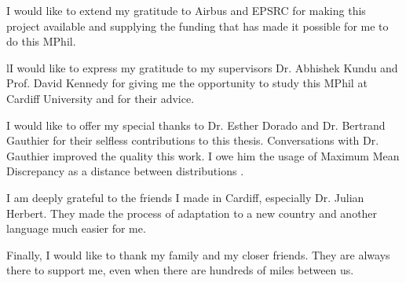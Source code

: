\documentclass[
12pt, %
english, %
nohyperref, %
headsepline, %
]{MastersDoctoralThesis} %
\theoremstyle{remark}
\begin{document}

\begin{acknowledgements}
\addchaptertocentry{\acknowledgementname} %
\onehalfspacing

I would like to extend my gratitude to Airbus and EPSRC for making this project available and supplying the funding that has made it possible for me to do this MPhil.

lI would like to express my gratitude to my supervisors Dr. Abhishek Kundu and Prof. David Kennedy for giving me the opportunity to study this MPhil at Cardiff University and for their advice.%

I would like to offer my special thanks to Dr. Esther Dorado and Dr. Bertrand Gauthier for their selfless contributions to this thesis. Conversations with Dr. Gauthier improved the quality this work. I owe him the usage of Maximum Mean Discrepancy as a distance between distributions .

I am deeply grateful to the friends I made in Cardiff, especially Dr. Julian Herbert. They made the process of adaptation to a new country and another language much easier for me.

Finally, I would like to thank my family and my closer friends. They are always there to support me, even when there are hundreds of miles between us.

\end{acknowledgements}


\tableofcontents %

\listoffigures %

\listofalgorithms


\end{document}
